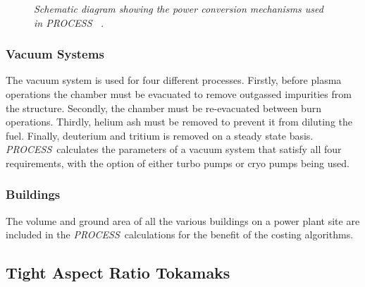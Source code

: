 \documentclass[11pt,a4paper]{report}
\newcommand{\PS}{\mbox{\it PROCESS\/ }}
\begin{document}
\begin{figure}
\centerline{}
\vspace{-12mm}
\caption[PWRCONV]
{\it Schematic diagram showing the power conversion mechanisms used in \PS
\cite[Note 0166]{PWF}.}
\label{fig:pwrconv}
\end{figure}

\subsubsection{Vacuum Systems}
The vacuum system is used for four different processes. Firstly, before plasma
operations the chamber must be evacuated to remove outgassed impurities from
the structure. Secondly, the chamber must be re-evacuated between burn
operations. Thirdly, helium ash must be removed to prevent it from diluting
the fuel. Finally, deuterium and tritium is removed on a steady state
basis. \PS calculates the parameters of a vacuum system that satisfy all four
requirements, with the option of either turbo pumps or cryo pumps being used.

\subsubsection{Buildings}
The volume and ground area of all the various buildings on a power plant site
are included in the \PS calculations for the benefit of the costing
algorithms.

\subsection{Tight Aspect Ratio Tokamaks}
\end{document}
